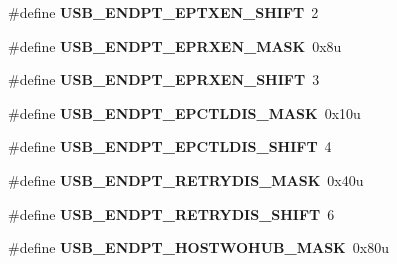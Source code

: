 \begin{DoxyCompactItemize}
\item 
\#define {\bfseries U\+S\+B\+\_\+\+E\+N\+D\+P\+T\+\_\+\+E\+P\+T\+X\+E\+N\+\_\+\+S\+H\+I\+FT}~2\hypertarget{group__USB__Register__Masks_gad281aa3cd601a2a93f60e0145dd8e564}{}\label{group__USB__Register__Masks_gad281aa3cd601a2a93f60e0145dd8e564}

\item 
\#define {\bfseries U\+S\+B\+\_\+\+E\+N\+D\+P\+T\+\_\+\+E\+P\+R\+X\+E\+N\+\_\+\+M\+A\+SK}~0x8u\hypertarget{group__USB__Register__Masks_ga80f33455bd11aa0be5cd5d876ab48228}{}\label{group__USB__Register__Masks_ga80f33455bd11aa0be5cd5d876ab48228}

\item 
\#define {\bfseries U\+S\+B\+\_\+\+E\+N\+D\+P\+T\+\_\+\+E\+P\+R\+X\+E\+N\+\_\+\+S\+H\+I\+FT}~3\hypertarget{group__USB__Register__Masks_gaeba041e492aca9bfbdbc90584e00cba9}{}\label{group__USB__Register__Masks_gaeba041e492aca9bfbdbc90584e00cba9}

\item 
\#define {\bfseries U\+S\+B\+\_\+\+E\+N\+D\+P\+T\+\_\+\+E\+P\+C\+T\+L\+D\+I\+S\+\_\+\+M\+A\+SK}~0x10u\hypertarget{group__USB__Register__Masks_ga07f43f2be7e974a763e86087f47e14d6}{}\label{group__USB__Register__Masks_ga07f43f2be7e974a763e86087f47e14d6}

\item 
\#define {\bfseries U\+S\+B\+\_\+\+E\+N\+D\+P\+T\+\_\+\+E\+P\+C\+T\+L\+D\+I\+S\+\_\+\+S\+H\+I\+FT}~4\hypertarget{group__USB__Register__Masks_ga0607b1ed419fd16c0c3635042ff33fd4}{}\label{group__USB__Register__Masks_ga0607b1ed419fd16c0c3635042ff33fd4}

\item 
\#define {\bfseries U\+S\+B\+\_\+\+E\+N\+D\+P\+T\+\_\+\+R\+E\+T\+R\+Y\+D\+I\+S\+\_\+\+M\+A\+SK}~0x40u\hypertarget{group__USB__Register__Masks_ga116b045c1163bccc05a270beb6ee2f3d}{}\label{group__USB__Register__Masks_ga116b045c1163bccc05a270beb6ee2f3d}

\item 
\#define {\bfseries U\+S\+B\+\_\+\+E\+N\+D\+P\+T\+\_\+\+R\+E\+T\+R\+Y\+D\+I\+S\+\_\+\+S\+H\+I\+FT}~6\hypertarget{group__USB__Register__Masks_ga7d07ae7b5369ee4cbfa19194ebc2e143}{}\label{group__USB__Register__Masks_ga7d07ae7b5369ee4cbfa19194ebc2e143}

\item 
\#define {\bfseries U\+S\+B\+\_\+\+E\+N\+D\+P\+T\+\_\+\+H\+O\+S\+T\+W\+O\+H\+U\+B\+\_\+\+M\+A\+SK}~0x80u\hypertarget{group__USB__Register__Masks_ga34644591d90c80611273ef5561529c34}{}\label{group__USB__Register__Masks_ga34644591d90c80611273ef5561529c34}


\end{DoxyCompactItemize}
